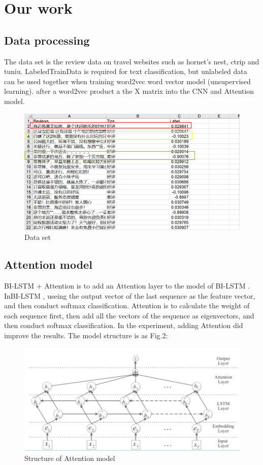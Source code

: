\documentclass[conference]{IEEEtran}
\begin{document}
\section{Our work}
\subsection{Data processing}
The data set is the review data on travel websites such as hornet's nest, ctrip and tuniu. LabeledTrainData is required for text classification, but unlabeled data can be used together when training word2vec word vector model (unsupervised learning). after a word2vec product a the X matrix into the CNN and Attention model.
\begin{figure}[H]
    \centering
    \includegraphics[width=0.8\linewidth]{figure/Picture1}
    \caption{Data set}
\end{figure}


\subsection{Attention model}
BI-LSTM + Attention is to add an Attention layer to the model of BI-LSTM . InBI-LSTM , useing the output vector of the last sequence as the feature vector, and then conduct softmax classification. Attention is to calculate the weight of each sequence first, then add all the vectors of the sequence as eigenvectors, and then conduct softmax classification. In the experiment, adding Attention did improve the results. The model structure is as Fig.2:
\begin{figure}[H]
    \centering
    \includegraphics[width=0.8\linewidth]{figure/Picture2}
    \caption{Structure of Attention model}
\end{figure}
\end{document}
